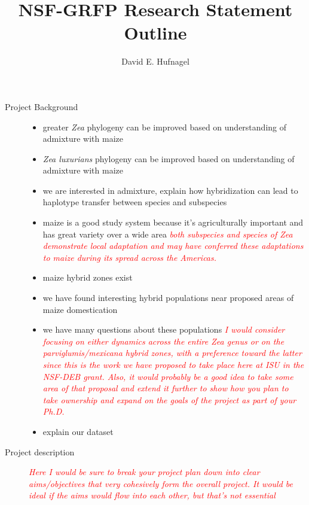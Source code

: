 \documentclass[11pt]{amsart}
\title{NSF-GRFP Research Statement Outline}
\author{David E. Hufnagel}
\newcommand{\mbh}[1]{\textcolor{red}{ \emph{\scriptsize  #1}} }
\begin{document}
\maketitle

\begin{description}
	\item[Project Background] \hfill
		\begin{itemize}
			\item greater \emph{Zea} phylogeny can be improved based on understanding of admixture with maize
			\item \emph{Zea luxurians} phylogeny  can be improved based on understanding of admixture with maize
			\item we are interested in admixture, explain how hybridization can lead to haplotype transfer between species and subspecies
			\item maize is a good study system because it's agriculturally important and has great variety over a wide area \mbh{both subspecies and species of \emph{Zea} demonstrate local adaptation and may have conferred these adaptations to maize during its spread across the Americas.}
			\item maize hybrid zones exist
			\item we have found interesting hybrid populations near proposed areas of maize domestication
			\item we have many questions about these populations
			\mbh{I would consider focusing on either dynamics across the entire \emph{Zea} genus or on the \emph{parviglumis}/\emph{mexicana} hybrid zones, with a preference toward the latter since this is the work we have proposed to take place here at ISU in the NSF-DEB grant.  Also, it would probably be a good idea to take some area of that proposal and extend it further to show how you plan to take ownership and expand on the goals of the project as part of your Ph.D.}
			\item explain our dataset
		\end{itemize}
	\item[Project description] \hfill
	\mbh{Here I would be sure to break your project plan down into clear aims/objectives that very cohesively form the overall project.  It would be ideal if the aims would flow into each other, but that's not essential}

\end{description}
\end{document}
